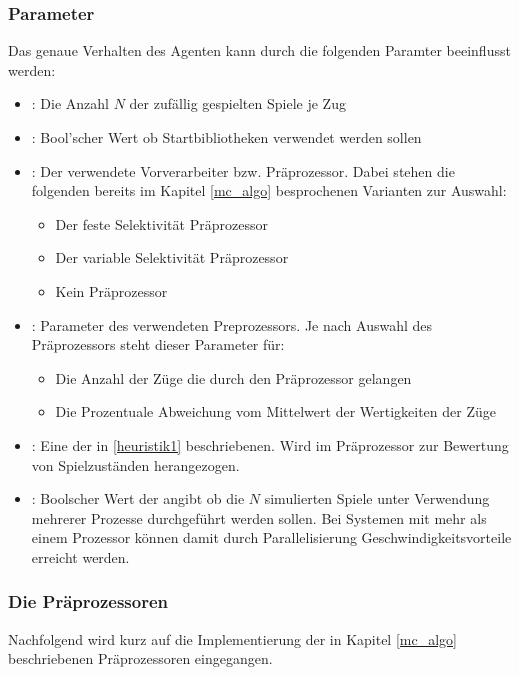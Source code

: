 \subsubsection{Parameter}
Das genaue Verhalten des Agenten kann durch die folgenden Paramter beeinflusst werden: 
\begin{itemize}
\item {}: Die Anzahl $N$ der zufällig gespielten Spiele je Zug
\item {}: Bool'scher Wert ob Startbibliotheken verwendet werden sollen
\item {}: Der verwendete Vorverarbeiter bzw. Präprozessor. Dabei stehen die folgenden bereits im Kapitel \ref{mc_algo} besprochenen Varianten zur Auswahl:
\begin{itemize}
    \item Der feste Selektivität Präprozessor
    \item Der variable Selektivität Präprozessor
    \item Kein Präprozessor
\end{itemize}
\item {}: Parameter des verwendeten Preprozessors. Je nach Auswahl des Präprozessors steht dieser Parameter für:
\begin{itemize}
    \item Die Anzahl der Züge die durch den Präprozessor gelangen
    \item Die Prozentuale Abweichung vom Mittelwert der Wertigkeiten der Züge
\end{itemize}
\item {}: Eine der in \ref{heuristik1} beschriebenen. Wird im Präprozessor zur Bewertung von Spielzuständen herangezogen.
\item {}: Boolscher Wert der angibt ob die $N$ simulierten Spiele unter Verwendung mehrerer Prozesse durchgeführt werden sollen. Bei Systemen mit mehr als einem Prozessor können damit durch Parallelisierung Geschwindigkeitsvorteile erreicht werden. 
\end{itemize}

\subsubsection{Die Präprozessoren}
Nachfolgend wird kurz auf die Implementierung der in Kapitel \ref{mc_algo} beschriebenen Präprozessoren eingegangen.
